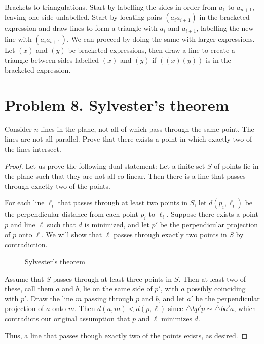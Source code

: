 \documentclass{article}
\begin{document}
\begin{enumerate}[label=(\alph*)]
    \par Brackets to triangulations. Start by labelling the sides in order from $a_1$ to $a_{n+1}$, leaving one side unlabelled. Start by locating pairs $(a_ia_{i+1})$ in the bracketed expression and draw lines to form a triangle with $a_i$ and $a_{i+1}$, labelling the new line with $(a_ia_{i+1})$. We can proceed by doing the same with larger expressions. Let $(x)$ and $(y)$ be bracketed expressions, then draw a line to create a triangle between sides labelled $(x)$ and $(y)$ if $((x)(y))$ is in the bracketed expression.
\end{enumerate}


\section{Problem 8. Sylvester’s theorem}
Consider $n$ lines in the plane, not all of which pass through the same point. The lines are not all parallel. Prove that there exists a point in which exactly two of the lines intersect.
\begin{proof}
Let us prove the following dual statement: Let a finite set $S$ of points lie in the plane such that they are not all co-linear. Then there is a line that passes through exactly two of the points.
\par For each line $\ell_i$ that passes through at least two points in $S$, let $d(p_i, \ell_i)$ be the perpendicular distance from each point $p_i$ to $\ell_i$. Suppose there exists a point $p$ and line $\ell$ such that $d$ is minimized, and let $p'$ be the perpendicular projection of $p$ onto $\ell$. We will show that $\ell$ passes through exactly two points in $S$ by contradiction.

\begin{figure}[ht]
    \centering
    
    \caption{Sylvester's theorem}
\end{figure}

\par Assume that $S$ passes through at least three points in $S$. Then at least two of these, call them $a$ and $b$, lie on the same side of $p'$, with $a$ possibly coinciding with $p'$. Draw the line $m$ passing through $p$ and $b$, and let $a'$ be the perpendicular projection of $a$ onto $m$. Then $d(a,m)<d(p,\ell )$ since $\triangle bp'p\sim \triangle ba'a$, which contradicts our original assumption that $p$ and $\ell$ minimizes $d$.
\par Thus, a line that passes though exactly two of the points exists, as desired.
\end{proof}
\end{document}
